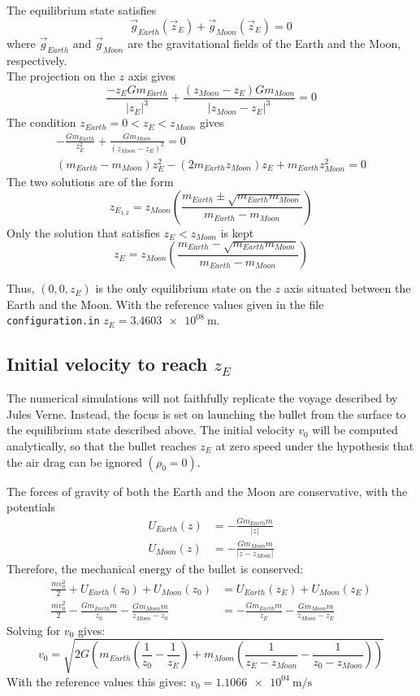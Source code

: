 \documentclass[a4paper,12pt]{article}
\def \be {\begin{equation}}
\def \ee {\end{equation}}
\newcommand{\abs}[1]{\lvert#1\rvert} %
\newcommand{\zM}{z_{Moon}} %
\newcommand{\mE}{m_{Earth}} %
\newcommand{\mM}{m_{Moon}} %
\begin{document}
The equilibrium state satisfies
\be
    \vec{g}_{Earth}(\vec{z}_E) + \vec{g}_{Moon}(\vec{z}_E) = 0
\ee
where $\vec{g}_{Earth}$ and $\vec{g}_{Moon}$ are the gravitational fields of the Earth and the Moon, respectively.\\
The projection on the $z$ axis gives
\be
    \frac{-z_E G\mE}{\abs{z_E}^3} + \frac{(\zM-z_E)G\mM}{\abs{\zM-z_E}^3} = 0
\ee
The condition \( z_{Earth} = 0 < z_E < \zM \) gives
\begin{gather}
    -\frac{G\mE}{z_E^2} + \frac{G\mM}{(\zM-z_E)^2} = 0 \\
    (\mE-\mM)z_E^2 - (2\mE\zM)z_E + \mE\zM^2 = 0
\end{gather}
The two solutions are of the form
\be
    z_{E_{1,2}} = \zM\left(\frac{\mE\pm\sqrt{\mE\mM}}{\mE-\mM}\right)
\ee
Only the solution that satisfies $z_E < \zM$ is kept
\be
    z_E = \zM\left(\frac{\mE-\sqrt{\mE\mM}}{\mE-\mM}\right)
\ee

Thus, $(0, 0, z_E)$ is the only equilibrium state on the $z$ axis situated between the Earth and the Moon. With the reference values given in the file \verb|configuration.in| $z_E = \SI{3.4603e08}{\meter}$.

\subsection{Initial velocity to reach $z_E$}

The numerical simulations will not faithfully replicate the voyage described by Jules Verne. Instead, the focus is set on launching the bullet from the surface to the equilibrium state described above. The initial velocity $v_0$ will be computed analytically, so that the bullet reaches $z_E$ at zero speed under the hypothesis that the air drag can be ignored $(\rho_0 = 0)$. 

The forces of gravity of both the Earth and the Moon are conservative, with the potentials
\begin{align}
    U_{Earth}(z) &= -\frac{G\mE m}{\abs{z}} \\
    U_{Moon}(z) &= -\frac{G\mM m}{\abs{z-\zM}}
\end{align}
Therefore, the mechanical energy of the bullet is conserved:
\begin{align}
    \frac{m v_0^2}{2} + U_{Earth}(z_0) + U_{Moon}(z_0) &= U_{Earth}(z_E) + U_{Moon}(z_E) \\
    \frac{m v_0^2}{2} - \frac{G\mE m}{z_0} - \frac{G\mM m}{\zM -z_0} &=  -\frac{G\mE m}{z_E} - \frac{G\mM m}{\zM - z_E}
\end{align}
Solving for $v_0 $ gives:
\be
    v_0 = \sqrt{2G\left(\mE\left(\frac{1}{z_0}-\frac{1}{z_E}\right) + \mM\left(\frac{1}{z_E-\zM}-\frac{1}{z_0-\zM}\right)\right)}
\ee
With the reference values this gives: $v_0 = \SI{1.1066e04}{\meter\per\second}$
\end{document}
